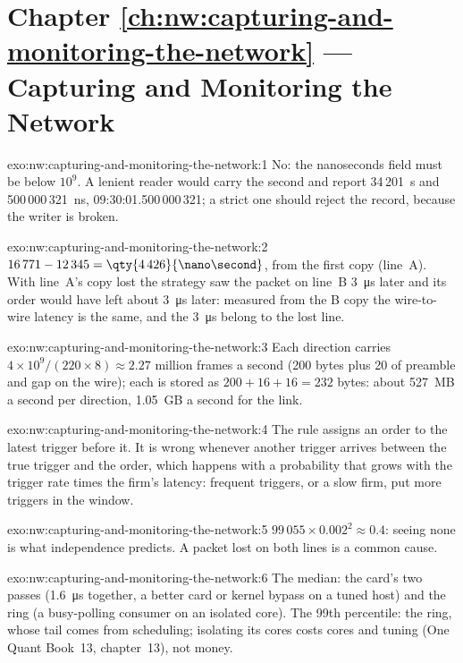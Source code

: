\section*{Chapter \ref{ch:nw:capturing-and-monitoring-the-network} --- Capturing and Monitoring the Network}

\begin{solution}{exo:nw:capturing-and-monitoring-the-network:1}
No: the nanoseconds field must be below $10^9$. A lenient reader would carry the second and report 34\,201~s and 500\,000\,321~ns,
09:30:01.500\,000\,321; a strict one should reject the record, because the writer is broken.
\end{solution}

\begin{solution}{exo:nw:capturing-and-monitoring-the-network:2}
$16\,771 - 12\,345 = \qty{4\,426}{\nano\second}$, from the first copy (line~A). With line~A's copy lost the strategy saw the packet on line~B
\qty{3}{\micro\second} later and its order would have left about \qty{3}{\micro\second} later: measured from the B copy the wire-to-wire latency is
the same, and the \qty{3}{\micro\second} belong to the lost line.
\end{solution}

\begin{solution}{exo:nw:capturing-and-monitoring-the-network:3}
Each direction carries $4 \times 10^9 / (220 \times 8) \approx 2.27$ million frames a second (200 bytes plus 20 of preamble and gap on the
wire); each is stored as $200 + 16 + 16 = 232$ bytes: about 527~MB a second per direction, 1.05~GB a second for the link.
\end{solution}

\begin{solution}{exo:nw:capturing-and-monitoring-the-network:4}
The rule assigns an order to the latest trigger before it. It is wrong whenever another trigger arrives between the true trigger and the
order, which happens with a probability that grows with the trigger rate times the firm's latency: frequent triggers, or a slow firm, put more
triggers in the window.
\end{solution}

\begin{solution}{exo:nw:capturing-and-monitoring-the-network:5}
$99\,055 \times 0.002^2 \approx 0.4$: seeing none is what independence predicts. A packet lost on both lines is a common cause.
\end{solution}

\begin{solution}{exo:nw:capturing-and-monitoring-the-network:6}
The median: the card's two passes (1.6~\unit{\micro\second} together, a better card or kernel bypass on a tuned host) and the ring
(a busy-polling consumer on an isolated core). The 99th percentile: the ring, whose tail comes from scheduling; isolating its cores costs
cores and tuning (One Quant Book~13, chapter~13), not money.
\end{solution}

